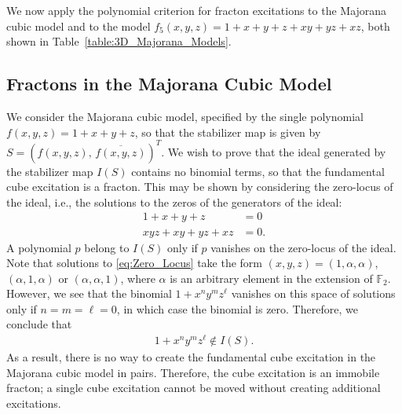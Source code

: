 \documentclass[aps,twocolumn,preprintnumbers,floatfix,showpacs,prx]{revtex4-1}
\begin{document}
We now apply the polynomial criterion for fracton excitations
to the Majorana cubic model and to the model $f_{5}(x,y,z) = 1 + x + y + z + xy + yz + xz$,
both shown in Table~\ref{table:3D_Majorana_Models}.


\subsection{Fractons in the Majorana Cubic Model}
We consider the Majorana cubic model,
specified by the single polynomial  $f(x,y,z) = 1 + x + y + z$,
so that the stabilizer map is given by $S = \left(f(x,y,z),\,\overline{f(x,y,z)}\right)^{T}$.
We wish to prove that the ideal generated by the stabilizer map $I(S)$
contains no binomial terms, so that the fundamental cube excitation is a fracton.
This may be shown by considering the zero-locus of the ideal,
i.e., the solutions to the zeros of the generators of the ideal:
\begin{align}\label{eq:Zero_Locus}
1 + x + y + z &= 0\\
xyz + xy + yz + xz &= 0.
\end{align}
A polynomial $p$ belong to $I(S)$ only if %
$p$ vanishes on the zero-locus of the ideal.
Note that solutions to \eqref{eq:Zero_Locus} take the form
$(x,y,z) = (1,\alpha,\alpha)$, $(\alpha,1,\alpha)$ or $(\alpha,\alpha,1)$,
where $\alpha$ is an arbitrary element in the extension of $\mathbb F_2$.
However, we see that the binomial $1 + x^{n}y^{m}z^{\ell}$ vanishes on this space of solutions
only if $n = m = \ell = 0$, 
in which case the binomial is zero.
Therefore, we conclude that 
\begin{align}
1 + x^{n}y^{m}z^{\ell}\notin I(S).
\end{align}
As a result, there is no way to create the fundamental cube excitation in the Majorana cubic model in pairs.
Therefore, the cube excitation is an immobile fracton;
a single cube excitation cannot be moved without creating additional excitations.  
\end{document}
